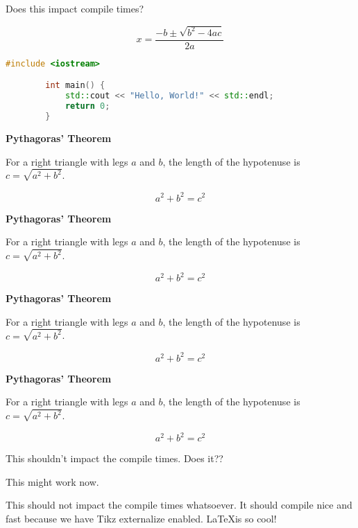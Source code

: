 



\lipsum[10]

Does this impact compile times?

\begin{equation*}
    x = \frac{-b \pm \sqrt{b^2 - 4ac}}{2a}
\end{equation*}

\begin{lstlisting}[language=C++]
        #include <iostream>

        int main() {
            std::cout << "Hello, World!" << std::endl;
            return 0;
        }
\end{lstlisting}

\begin{theorem}
    \textbf{Pythagoras' Theorem}

    For a right triangle with legs $a$ and $b$, the length of the hypotenuse is
    $c = \sqrt{a^2 + b^2}$.

    \begin{equation*}
        a^2 + b^2 = c^2
    \end{equation*}
\end{theorem}

\begin{lemma}
    \textbf{Pythagoras' Theorem}

    For a right triangle with legs $a$ and $b$, the length of the hypotenuse is
    $c = \sqrt{a^2 + b^2}$.

    \begin{equation*}
        a^2 + b^2 = c^2
    \end{equation*}
\end{lemma}

\begin{corollary}
    \textbf{Pythagoras' Theorem}

    For a right triangle with legs $a$ and $b$, the length of the hypotenuse is
    $c = \sqrt{a^2 + b^2}$.

    \begin{equation*}
        a^2 + b^2 = c^2
    \end{equation*}
\end{corollary}

\begin{proposition}
    \textbf{Pythagoras' Theorem}

    For a right triangle with legs $a$ and $b$, the length of the hypotenuse is
    $c = \sqrt{a^2 + b^2}$.

    \begin{equation*}
        a^2 + b^2 = c^2
    \end{equation*}
\end{proposition}

This shouldn't impact the compile times. Does it??

This might work now.

This should not impact the compile times whatsoever. It should compile nice and
fast because we have Tikz externalize enabled. \LaTeX is so cool!
